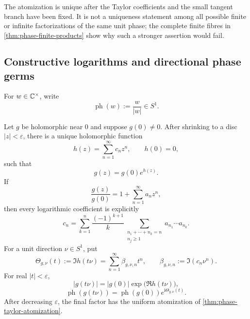 The atomization is unique after the Taylor coefficients and the small tangent
branch have been fixed.  It is not a uniqueness statement among all possible
finite or infinite factorizations of the same unit phase; the complete finite
fibres in \cref{thm:phase-finite-products} show why such a stronger assertion
would fail.

\subsection{Constructive logarithms and directional phase germs}

For \(w\in\mathbb C^\times\), write
\[
 \operatorname{ph}(w):=\frac{w}{|w|}\in S^1.
\]

\begin{theorem}
\label{thm:phase-local-logarithm}
Let \(g\) be holomorphic near \(0\) and suppose \(g(0)\ne0\).  After shrinking
to a disc \(|z|<\varepsilon\), there is a unique holomorphic function
\[
 h(z)=\sum_{n=1}^{\infty}c_nz^n,
 \qquad h(0)=0,
\]
such that
\[
 g(z)=g(0)e^{h(z)}.
\]
If
\[
 \frac{g(z)}{g(0)}
 =
 1+\sum_{n=1}^{\infty}a_nz^n,
\]
then every logarithmic coefficient is explicitly
\[
 c_n
 =
 \sum_{k=1}^n\frac{(-1)^{k+1}}{k}
 \sum_{\substack{n_1+\cdots+n_k=n\\n_j\geq1}}
 a_{n_1}\cdots a_{n_k}.
\]
For a unit direction \(\nu\in S^1\), put
\[
 \Theta_{g,\nu}(t)
 :=
 \Im h(t\nu)
 =
 \sum_{n=1}^{\infty}\beta_{g,\nu,n}t^n,
\qquad
 \beta_{g,\nu,n}:=\Im(c_n\nu^n).
\]
For real \(|t|<\varepsilon\),
\[
 |g(t\nu)|
 =
 |g(0)|
 \exp\bigl(\Re h(t\nu)\bigr),
\]
\[
 \operatorname{ph}(g(t\nu))
 =
 \operatorname{ph}(g(0))e^{\mathrm i\Theta_{g,\nu}(t)}.
\]
After decreasing \(\varepsilon\), the final factor has the uniform atomization
of \cref{thm:phase-taylor-atomization}.
\end{theorem}


